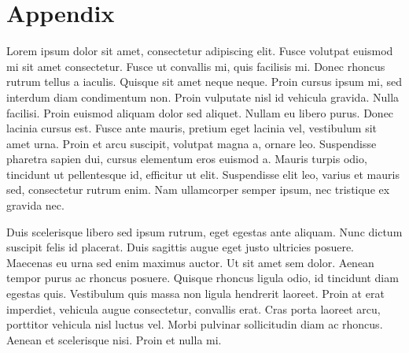\documentclass[main.tex]{subfiles}
\begin{document}
\chapter{Appendix}


Lorem ipsum dolor sit amet, consectetur adipiscing elit. Fusce volutpat euismod mi sit amet consectetur. Fusce ut convallis mi, quis facilisis mi. Donec rhoncus rutrum tellus a iaculis. Quisque sit amet neque neque. Proin cursus ipsum mi, sed interdum diam condimentum non. Proin vulputate nisl id vehicula gravida. Nulla facilisi. Proin euismod aliquam dolor sed aliquet. Nullam eu libero purus. Donec lacinia cursus est. Fusce ante mauris, pretium eget lacinia vel, vestibulum sit amet urna. Proin et arcu suscipit, volutpat magna a, ornare leo. Suspendisse pharetra sapien dui, cursus elementum eros euismod a. Mauris turpis odio, tincidunt ut pellentesque id, efficitur ut elit. Suspendisse elit leo, varius et mauris sed, consectetur rutrum enim. Nam ullamcorper semper ipsum, nec tristique ex gravida nec.

Duis scelerisque libero sed ipsum rutrum, eget egestas ante aliquam. Nunc dictum suscipit felis id placerat. Duis sagittis augue eget justo ultricies posuere. Maecenas eu urna sed enim maximus auctor. Ut sit amet sem dolor. Aenean tempor purus ac rhoncus posuere. Quisque rhoncus ligula odio, id tincidunt diam egestas quis. Vestibulum quis massa non ligula hendrerit laoreet. Proin at erat imperdiet, vehicula augue consectetur, convallis erat. Cras porta laoreet arcu, porttitor vehicula nisl luctus vel. Morbi pulvinar sollicitudin diam ac rhoncus. Aenean et scelerisque nisi. Proin et nulla mi.
\end{document}
